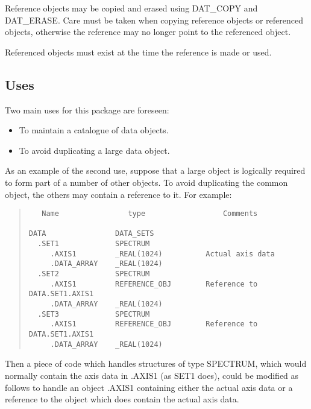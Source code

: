 Reference objects may be copied and erased using DAT\_COPY and DAT\_ERASE\@.
Care must be taken when copying reference objects or referenced objects,
otherwise the reference may no longer point to the referenced object.

Referenced objects must exist at the time the reference is made or used.

\subsection{Uses}

Two main uses for this package are foreseen:
\begin{itemize}
\item To maintain a catalogue of data objects.
\item To avoid duplicating a large data object.
\end{itemize}
As an example of the second use, suppose that a large object is logically
required to form part of a number of other objects.
To avoid duplicating the common object, the others may contain a reference to
it.
For example:

\begin{quote}

\begin{small}
\begin{verbatim}
   Name                type                  Comments

DATA                DATA_SETS
  .SET1             SPECTRUM
     .AXIS1         _REAL(1024)          Actual axis data
     .DATA_ARRAY    _REAL(1024)
  .SET2             SPECTRUM
     .AXIS1         REFERENCE_OBJ        Reference to DATA.SET1.AXIS1
     .DATA_ARRAY    _REAL(1024)
  .SET3             SPECTRUM
     .AXIS1         REFERENCE_OBJ        Reference to DATA.SET1.AXIS1
     .DATA_ARRAY    _REAL(1024)  
\end{verbatim}
\end{small}

\end{quote}
Then a piece of code which handles structures of type SPECTRUM, which would
normally contain the axis data in .AXIS1 (as SET1 does), could be modified as
follows to handle an object .AXIS1 containing either the actual axis data or
a reference to the object which does contain the actual axis data.


